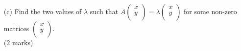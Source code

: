 \documentclass[12pt]{article}
\begin{document}
\begin{enumerate}
\begin{enumerate}
		\begin{enumerate}
			\item [(i)]Prove that $\begin{vmatrix}
				p - \lambda_1 & q \\ 
				r & s - \lambda_1   \notag
				\end{vmatrix} = 0$ and $\begin{vmatrix}
				p - \lambda_2 & q \\ 
				r & s - \lambda_2   \notag
				\end{vmatrix} = 0$. 
			\item [(ii)]Prove that $\lambda_1$ and $\lambda_2$ are the roots of the equation $\lambda^2 - \text{tr}(C) \cdot \lambda + |C| = 0$.
		\end{enumerate}
		(5 marks)
		\item [(c)]Find the two values of $\lambda$ such that $A\begin{pmatrix}
			x\\y\\
		\end{pmatrix} = \lambda \begin{pmatrix}
			x\\y\\
		\end{pmatrix}$ for some non-zero matrices $\begin{pmatrix}
			x\\y\\
		\end{pmatrix}$. \\(2 marks)
	\end{enumerate}



\end{enumerate}
\end{document}
